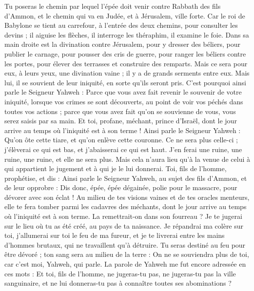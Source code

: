 \begin{multicols}{2}
Tu poseras le chemin par lequel l'épée doit venir contre Rabbath des fils d’Ammon, et le chemin qui va en Judée, et à Jérusalem, ville forte.
Car le roi de Babylone se tient au carrefour, à l’entrée des deux chemins, pour consulter les devins ; il aiguise les flèches, il interroge les théraphim, il examine le foie.
Dans sa main droite est la divination contre Jérusalem, pour y dresser des béliers, pour publier le carnage, pour pousser des cris de guerre, pour ranger les béliers contre les portes, pour élever des terrasses et construire des remparts.
Mais ce sera pour eux, à leurs yeux, une divination vaine ; il y a de grands serments entre eux. Mais lui, il se souvient de leur iniquité, en sorte qu’ils seront pris.
C'est pourquoi ainsi parle le Seigneur Yahweh : Parce que vous avez fait revenir le souvenir de votre iniquité, lorsque vos crimes se sont découverts, au point de voir vos péchés dans toutes vos actions ; parce que vous avez fait qu'on se souvienne de vous, vous serez saisis par sa main.
Et toi, profane, méchant, prince d'Israël, dont le jour arrive au temps où l’iniquité est à son terme !
Ainsi parle le Seigneur Yahweh : Qu'on ôte cette tiare, et qu'on enlève cette couronne. Ce ne sera plus celle-ci ; j'élèverai ce qui est bas, et j'abaisserai ce qui est haut.
J’en ferai une ruine, une ruine, une ruine, et elle ne sera plus. Mais cela n’aura lieu qu’à la venue de celui à qui appartient le jugement et à qui je le lui donnerai.
Toi, fils de l’homme, prophétise, et dis : Ainsi parle le Seigneur Yahweh, au sujet des fils d’Ammon, et de leur opprobre : Dis donc, épée, épée dégainée, polie pour le massacre, pour dévorer avec son éclat !
Au milieu de tes visions vaines et de tes oracles menteurs, elle te fera tomber parmi les cadavres des méchants, dont le jour arrive au temps où l’iniquité est à son terme.
La remettrait-on dans son fourreau ? Je te jugerai sur le lieu où tu as été créé, au pays de ta naissance.
Je répandrai ma colère sur toi, j'allumerai sur toi le feu de ma fureur, et je te livrerai entre les mains d'hommes brutaux,  qui ne travaillent qu’à détruire.
Tu seras destiné au feu pour être dévoré ; ton sang sera au milieu de la terre : On ne se souviendra plus de toi, car c'est moi, Yahweh, qui parle.
\VerseOne{}La parole de Yahweh me fut encore adressée en ces mots :
Et toi, fils de l’homme, ne jugeras-tu pas, ne jugeras-tu pas la ville sanguinaire, et ne lui donneras-tu pas à connaître toutes ses abominations ?

\end{multicols}

